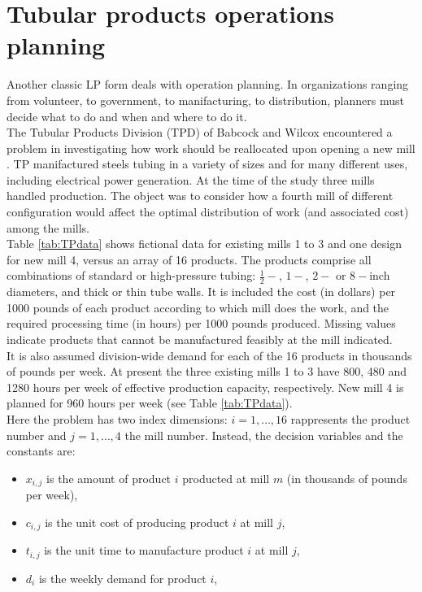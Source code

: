 \documentclass[a4paper,10 pt,titlepage,twoside]{book}
\theoremstyle{plain}
\theoremstyle{definition}
\theoremstyle{remark}
\begin{document}
{{\section{Tubular products operations planning}
Another classic LP form deals with operation planning. In organizations ranging from volunteer, to government, to manifacturing, to distribution, planners must decide what to do and when and where to do it.\\
The Tubular Products Division (TPD) of Babcock and Wilcox encountered a problem in investigating how work should be reallocated upon opening a new mill \cite{FEM}. TP manifactured steels tubing in a variety of sizes and for many different uses, including electrical power generation. At the time of the study three mills handled production. The object was to consider how a fourth mill of different configuration would affect the optimal distribution of work (and associated cost) among the mills.\\Table \ref{tab:TPdata} shows fictional data for existing mills 1 to 3 and one design for new mill 4, versus an array of 16 products. The products comprise all combinations of standard or high-pressure tubing: $\frac{1}{2}-$, $1-$, $2-$ or $8-$inch diameters, and thick or thin tube walls. It is included the cost (in dollars) per 1000 pounds of each product according to which mill does the work, and the required processing time (in hours) per 1000 pounds produced. Missing values indicate products that cannot be manufactured feasibly at the mill indicated.\\
It is also assumed division-wide demand for each of the 16 products in thousands of pounds per week. At present the three existing mills 1 to 3 have 800, 480 and 1280 hours per week of effective production capacity, respectively. New mill 4 is planned for 960 hours per week (see Table \ref{tab:TPdata}).\\
Here the problem has two index dimensions: $i= 1, \dots, 16$ rappresents the product number and $j=1, \dots, 4$ the mill number. Instead, the decision variables and the constants are:
\begin{itemize}
	\item $x_{i,j}$ is the amount of product $i$ producted at mill $m$ (in thousands of pounds per week),
	\item $c_{i,j}$ is the unit cost of producing product $i$ at mill $j$,
	\item $t_{i,j}$ is the unit time to manufacture product $i$ at mill $j$,
	\item $d_{i}$ is the weekly demand for product $i$,

\end{itemize}}}
\end{document}
